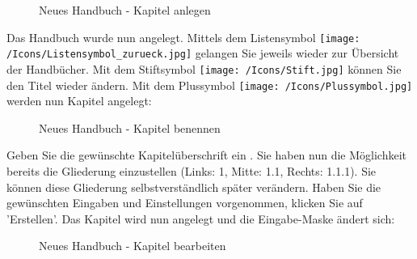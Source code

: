 \begin{figure}[H]
\caption{Neues Handbuch - Kapitel anlegen}
\end{figure}

Das Handbuch wurde nun angelegt. Mittels dem Listensymbol \texttt{[image: /Icons/Listensymbol\_zurueck.jpg]}  gelangen Sie jeweils wieder zur Übersicht der Handbücher. Mit dem Stiftsymbol \texttt{[image: /Icons/Stift.jpg]}  können Sie den Titel wieder ändern. Mit dem Plussymbol \texttt{[image: /Icons/Plussymbol.jpg]}  werden nun Kapitel angelegt:

\begin{figure}[H]
\caption{Neues Handbuch - Kapitel benennen}
\end{figure}

Geben Sie die gewünschte Kapitelüberschrift ein . Sie haben nun die Möglichkeit bereits die Gliederung einzustellen (Links: 1, Mitte: 1.1, Rechts: 1.1.1). Sie können diese Gliederung selbstverständlich später verändern. Haben Sie die gewünschten Eingaben und Einstellungen vorgenommen, klicken Sie auf 'Erstellen'. Das Kapitel wird nun angelegt und die Eingabe-Maske ändert sich:

\begin{figure}[H]
\caption{Neues Handbuch - Kapitel bearbeiten}
\end{figure}

